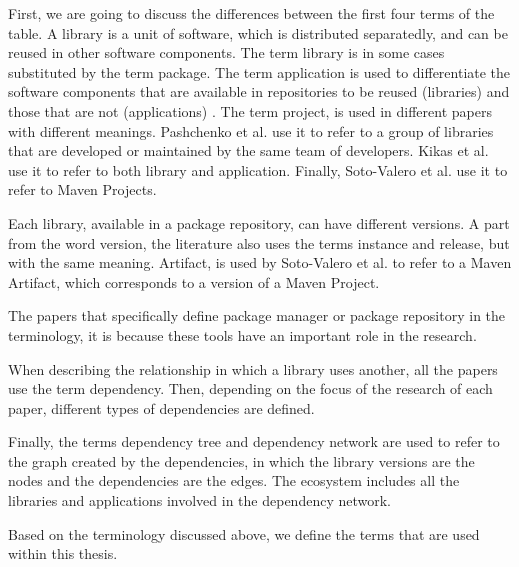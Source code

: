 \blankls
First, we are going to discuss the differences between the first four terms of the table. A library is a unit of software, which is distributed separatedly, and can be reused in other software components. The term library is in some cases substituted by the term package. The term application is used to differentiate the software components that are available in repositories to be reused (libraries) and those that are not (applications) \cite{kikas2017structure}.
The term project, is used in different papers with different meanings. Pashchenko et al. \cite{pashchenko2018vulnerable} use it to refer to a group of libraries that are developed or maintained by the same team of developers. Kikas et al. \cite{kikas2017structure} use it to refer to both library and application. Finally, Soto-Valero et al. use it to refer to Maven Projects.

Each library, available in a package repository, can have different versions. A part from the word version, the literature also uses the terms instance and release, but with the same meaning. Artifact, is used by Soto-Valero et al. to refer to a Maven Artifact, which corresponds to a version of a Maven Project.

The papers that specifically define package manager or package repository in the terminology, it is because these tools have an important role in the research.

When describing the relationship in which a library uses another, all the papers  use the term dependency. Then, depending on the focus of the research of each paper,  different types of dependencies are defined.


Finally, the terms dependency tree and dependency network are used to refer to the graph created by the dependencies, in which the library versions are the nodes and the dependencies are the edges. The ecosystem includes all the libraries and applications involved in the dependency network.

\blankl
Based on the terminology discussed above, we define the terms that are used within this thesis.

